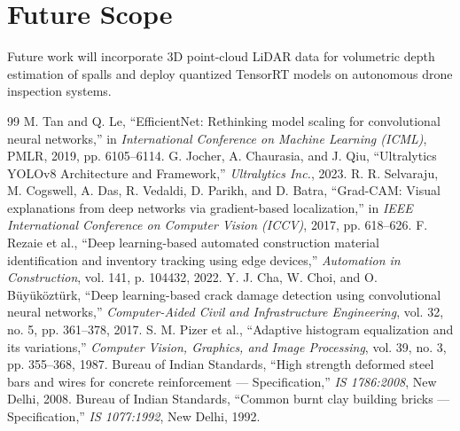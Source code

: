 \documentclass[12pt,a4paper]{report}
\theoremstyle{definition}
\begin{document}
\section{Future Scope}
Future work will incorporate 3D point-cloud LiDAR data for volumetric depth estimation of spalls and deploy quantized TensorRT models on autonomous drone inspection systems.

\begin{thebibliography}{99}
 M. Tan and Q. Le, ``EfficientNet: Rethinking model scaling for convolutional neural networks,'' in \textit{International Conference on Machine Learning (ICML)}, PMLR, 2019, pp. 6105--6114.
 G. Jocher, A. Chaurasia, and J. Qiu, ``Ultralytics YOLOv8 Architecture and Framework,'' \textit{Ultralytics Inc.}, 2023.
 R. R. Selvaraju, M. Cogswell, A. Das, R. Vedaldi, D. Parikh, and D. Batra, ``Grad-CAM: Visual explanations from deep networks via gradient-based localization,'' in \textit{IEEE International Conference on Computer Vision (ICCV)}, 2017, pp. 618--626.
 F. Rezaie et al., ``Deep learning-based automated construction material identification and inventory tracking using edge devices,'' \textit{Automation in Construction}, vol. 141, p. 104432, 2022.
 Y. J. Cha, W. Choi, and O. B{\"u}y{\"u}k{\"o}zt{\"u}rk, ``Deep learning-based crack damage detection using convolutional neural networks,'' \textit{Computer-Aided Civil and Infrastructure Engineering}, vol. 32, no. 5, pp. 361--378, 2017.
 S. M. Pizer et al., ``Adaptive histogram equalization and its variations,'' \textit{Computer Vision, Graphics, and Image Processing}, vol. 39, no. 3, pp. 355--368, 1987.
 Bureau of Indian Standards, ``High strength deformed steel bars and wires for concrete reinforcement --- Specification,'' \textit{IS 1786:2008}, New Delhi, 2008.
 Bureau of Indian Standards, ``Common burnt clay building bricks --- Specification,'' \textit{IS 1077:1992}, New Delhi, 1992.
\end{thebibliography}
\end{document}

